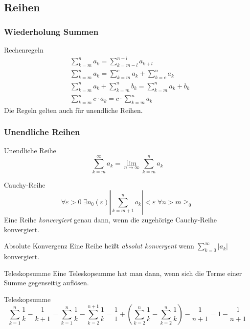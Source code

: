 \documentclass[german]{../spicker}
\begin{document}
\subsection{Reihen}
\subsubsection{Wiederholung Summen}
\begin{defi}{Rechenregeln}
    $$
        \begin{aligned}
             & \sum_{k=m}^n a_k = \sum_{k=m-l}^{n-l} a_{k+l}                \\
             & \sum_{k=m}^n a_k = \sum_{k=m}^c a_k + \sum_{k=c}^n a_k       \\
             & \sum_{k=m}^n a_k + \sum_{k=m}^n b_k = \sum_{k=m}^n a_k + b_k \\
             & \sum_{k=m}^n c\cdot a_k = c\cdot\sum_{k=m}^n a_k
        \end{aligned}
    $$
    Die Regeln gelten auch für unendliche Reihen.
\end{defi}

\subsubsection{Unendliche Reihen}
\begin{defi}{Unendliche Reihe}
    \[
        \sum_{k=m}^{\infty} a_k = \lim_{n\to\infty} \sum_{k=m}^{n} a_k
    \]
\end{defi}

\begin{defi}{Cauchy-Reihe}
    \[
        \forall\varepsilon>0 \;\exists n_0(\varepsilon) \left| \sum_{k=m+1}^n a_k \right| < \varepsilon \;\forall n>m\geq _0
    \]
    Eine Reihe \emph{konvergiert} genau dann, wenn die zugehörige Cauchy-Reihe konvergiert.
\end{defi}

\begin{defi}{Absolute Konvergenz}
    Eine Reihe heißt \emph{absolut konvergent} wenn $\sum_{k=0}^{\infty} |a_k|$ konvergiert.
\end{defi}

\begin{algo}{Teleskopsumme}
    Eine Teleskopsumme hat man dann, wenn sich die Terme einer Summe gegenseitig auflösen.
\end{algo}

\begin{example}{Teleskopsumme}
    \[
        \sum_{k=1}^n \frac{1}{k} - \frac{1}{k+1} = \sum_{k=1}^n \frac{1}{k} - \sum_{k=2}^{n+1} \frac{1}{k} = \frac{1}{1} +\left( \sum_{k=2}^n \frac{1}{k} - \sum_{k=2}^n \frac{1}{k} \right) - \frac{1}{n+1} = 1-\frac{1}{n+1}
    \]
\end{example}
\end{document}
